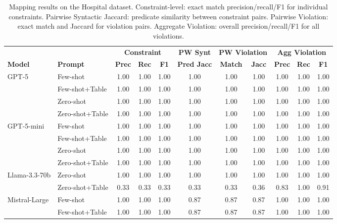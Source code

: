 \begin{table}[htbp]
\centering
\small
\caption{Mapping results on the Hospital dataset. Constraint-level: exact match precision/recall/F1 for individual constraints. Pairwise Syntactic Jaccard: predicate similarity between constraint pairs. Pairwise Violation: exact match and Jaccard for violation pairs. Aggregate Violation: overall precision/recall/F1 for all violations.}
\label{tab:mapping_results_hospital}
\begin{tabular}{@{}llccccccccc@{}}
\toprule
 & & \multicolumn{3}{c}{\textbf{Constraint}} & \textbf{PW Synt} & \multicolumn{2}{c}{\textbf{PW Violation}} & \multicolumn{3}{c}{\textbf{Agg Violation}} \\
\cmidrule(lr){3-5} \cmidrule(lr){6-6} \cmidrule(lr){7-8} \cmidrule(lr){9-11}
\textbf{Model} & \textbf{Prompt} & \textbf{Prec} & \textbf{Rec} & \textbf{F1} & \textbf{Pred Jacc} & \textbf{Match} & \textbf{Jacc} & \textbf{Prec} & \textbf{Rec} & \textbf{F1} \\
\midrule
\multirow{4}{*}{GPT-5} & Few-shot & 1.00 & 1.00 & 1.00 & 1.00 & 1.00 & 1.00 & 1.00 & 1.00 & 1.00 \\
 & Few-shot+Table & 1.00 & 1.00 & 1.00 & 1.00 & 1.00 & 1.00 & 1.00 & 1.00 & 1.00 \\
 & Zero-shot & 1.00 & 1.00 & 1.00 & 1.00 & 1.00 & 1.00 & 1.00 & 1.00 & 1.00 \\
 & Zero-shot+Table & 1.00 & 1.00 & 1.00 & 1.00 & 1.00 & 1.00 & 1.00 & 1.00 & 1.00 \\
\cmidrule(lr){1-11}
\multirow{4}{*}{GPT-5-mini} & Few-shot & 1.00 & 1.00 & 1.00 & 1.00 & 1.00 & 1.00 & 1.00 & 1.00 & 1.00 \\
 & Few-shot+Table & 1.00 & 1.00 & 1.00 & 1.00 & 1.00 & 1.00 & 1.00 & 1.00 & 1.00 \\
 & Zero-shot & 1.00 & 1.00 & 1.00 & 1.00 & 1.00 & 1.00 & 1.00 & 1.00 & 1.00 \\
 & Zero-shot+Table & 1.00 & 1.00 & 1.00 & 1.00 & 1.00 & 1.00 & 1.00 & 1.00 & 1.00 \\
\cmidrule(lr){1-11}
\multirow{2}{*}{Llama-3.3-70b} & Zero-shot & 1.00 & 1.00 & 1.00 & 1.00 & 1.00 & 1.00 & 1.00 & 1.00 & 1.00 \\
 & Zero-shot+Table & 0.33 & 0.33 & 0.33 & 0.33 & 0.33 & 0.36 & 0.83 & 1.00 & 0.91 \\
\cmidrule(lr){1-11}
\multirow{4}{*}{Mistral-Large} & Few-shot & 1.00 & 1.00 & 1.00 & 0.87 & 0.87 & 0.87 & 1.00 & 1.00 & 1.00 \\
 & Few-shot+Table & 1.00 & 1.00 & 1.00 & 0.87 & 0.87 & 0.87 & 1.00 & 1.00 & 1.00 \\

\end{tabular}
\end{table}
